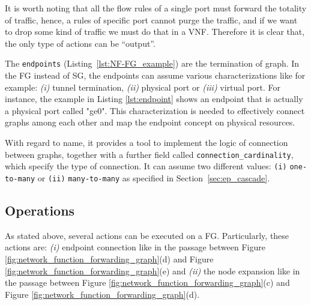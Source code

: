 It is worth noting that all the flow rules of a single port must forward the totality of traffic, hence, a rules of specific port cannot purge the traffic, and if we want to drop some kind of traffic we must do that in a VNF. Therefore it is clear that, the only type of actions can be ``output''.


The \texttt{endpoints} (Listing~\ref{lst:NF-FG_example}) are the termination of graph. In the FG instead of SG, the endpoints can assume various characterizations like for example: \textit{(i)} tunnel termination, \textit{(ii)} physical port or \textit{(iii)} virtual port. For instance, the example in Listing \ref{lst:endpoint} shows an endpoint that is actually a physical port called "ge0". This characterization is needed to effectively connect graphs among each other and map the endpoint concept on physical resources.


With regard to name, it provides a tool to implement the logic of connection between graphs, together with a further field called \texttt{connection\_cardinality}, which specify the type of connection. It can assume two different values: \texttt{(i)} \texttt{one-to-many} or \texttt{(ii)} \texttt{many-to-many} as specified in Section~\ref{sec:ep_cascade}.













\subsection{Operations}
As stated above, several actions can be executed on a FG. Particularly, these actions are: \textit{(i)} endpoint connection like in the passage between Figure \ref{fig:network_function_forwarding_graph}(d) and Figure \ref{fig:network_function_forwarding_graph}(e)  and \textit{(ii)} the node expansion like in the passage between Figure \ref{fig:network_function_forwarding_graph}(c) and Figure \ref{fig:network_function_forwarding_graph}(d).

